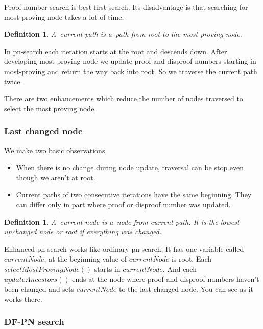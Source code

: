 Proof number search is best-first search. Its disadvantage is that searching for most-proving node takes
a lot of time. 

\newtheorem*{currentPath}{Definition}	
\begin{currentPath}
	A~{\sl current path} is a~path from root to the  most proving node. 
\end{currentPath}

In pn-search each iteration starts at the root and descends down. After developing
most proving node we update proof and disproof numbers starting in most-proving and 
return the way back into root. So we traverse the current path twice. 

There are two enhancements which reduce the number of nodes traversed to select the
most proving node. 

\subsubsection{Last changed node} \label{last}

We make two basic observations.
\begin{itemize}
\item When there is no change during node update, traversal can be stop even though we
aren't at root.
\item Current paths of two consecutive iterations have the same beginning. They can differ
only in part where proof or disproof number was updated.
\end{itemize}

\newtheorem*{currentNode}{Definition}	
\begin{currentNode}
A~{\sl current node} is a~node from current path. It is the lowest unchanged node or
root if everything was changed.
\end{currentNode}


Enhanced pn-search works like ordinary pn-search. It has one variable
called $currentNode$, at the beginning value of $currentNode$ is root. Each
$selectMostProvingNode()$ starts in $currentNode$. And each $updateAncestors()$
ends at the node where proof and disproof numbers haven't been changed and sets 
$currentNode$ to the last changed node. You can see as it works there. 

\subsubsection{DF-PN search} \label{dfpn}

